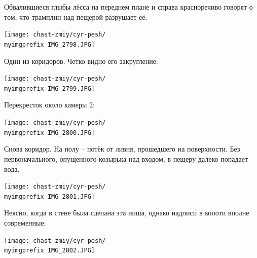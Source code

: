 \newpage

Обвалившиеся глыбы лёсса на переднем плане и справа красноречиво говорят о том, что трамплин над пещерой разрушает её.
\vspace*{\fill}

\begin{center}
\texttt{[image: chast-zmiy/cyr-pesh/\\myimgprefix IMG\_2798.JPG]}
\end{center}
\vspace*{\fill}

\newpage

Один из коридоров. Четко видно его закругление.
\vspace*{\fill}

\begin{center}
\texttt{[image: chast-zmiy/cyr-pesh/\\myimgprefix IMG\_2799.JPG]}
\end{center}
\vspace*{\fill}

\newpage

Перекресток около камеры 2:
\vspace*{\fill}

\begin{center}
\texttt{[image: chast-zmiy/cyr-pesh/\\myimgprefix IMG\_2800.JPG]}
\end{center}
\vspace*{\fill}

\newpage

Снова коридор. На полу – потёк от ливня, прошедшего на поверхности. Без первоначального, опущенного козырька над входом, в пещеру далеко попадает вода.
\vspace*{\fill}

\begin{center}
\texttt{[image: chast-zmiy/cyr-pesh/\\myimgprefix IMG\_2801.JPG]}
\end{center}
\vspace*{\fill}

\newpage

Неясно, когда в стене была сделана эта ниша, однако надписи в копоти вполне современные:
\vspace*{\fill}

\begin{center}
\texttt{[image: chast-zmiy/cyr-pesh/\\myimgprefix IMG\_2802.JPG]}
\end{center}
\vspace*{\fill}

